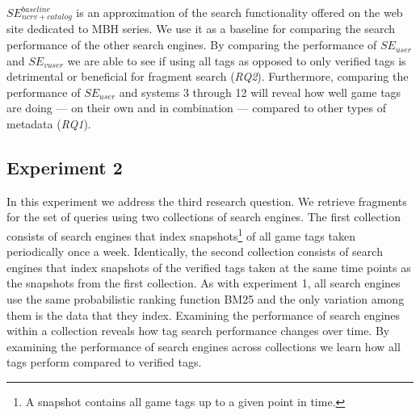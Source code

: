 \noindent
$SE_{ncrv+catalog}^{baseline}$ is an approximation of the search functionality offered on the web site dedicated to MBH series. We use it as a baseline for comparing the search performance of the other search engines. By comparing the performance of $SE_{user}$ and $SE_{vuser}$ we are able to see if using all tags as opposed to only verified tags is detrimental or beneficial for fragment search (\textit{RQ2}). Furthermore, comparing the performance of $SE_{user}$ and systems 3 through 12 will reveal how well game tags are doing --- on their own and in combination --- compared to other types of metadata (\textit{RQ1}).


\subsection{Experiment 2} \label{sec:experiment2-setup}
In this experiment we address the third research question. We retrieve fragments for the set of queries using two collections of search engines. The first collection consists of search engines that index snapshots\footnote{A snapshot contains all game tags up to a given point in time.} of all game tags taken periodically once a week. Identically, the second collection consists of search engines that index snapshots of the verified tags taken at the same time points as the snapshots from the first collection. As with experiment 1, all search engines use the same probabilistic ranking function BM25 and the only variation among them is the data that they index. Examining the performance of search engines within a collection reveals how tag search performance changes over time. By examining the performance of search engines across collections we learn how all tags perform compared to verified tags.

